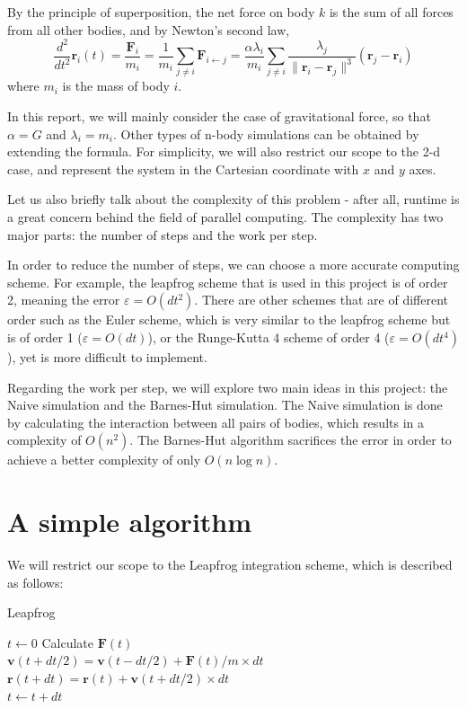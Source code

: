 \documentclass[12pt]{article}
\begin{document}
By the principle of superposition, the net force on body $k$ is the sum of all forces from all other bodies, and by Newton's second law, 
$$\frac{d^2}{dt^2} \boldsymbol{r}_i(t) 
= \frac{\boldsymbol{F}_i}{m_i} 
= \frac{1}{m_i} \sum_{j \neq i} \boldsymbol{F}_{i \gets j}
= \frac{\alpha \lambda_i}{m_i} \sum_{j \neq i} \frac{\lambda_j}{\|\boldsymbol{r}_i - \boldsymbol{r}_j\|^3} (\boldsymbol{r}_j - \boldsymbol{r}_i)$$
where $m_i$ is the mass of body $i$.

In this report, we will mainly consider the case of gravitational force, so that $\alpha = G$ and $\lambda_i = m_i$. Other types of n-body simulations can be obtained by extending the formula. For simplicity, we will also restrict our scope to the 2-d case, and represent the system in the Cartesian coordinate with $x$ and $y$ axes.

Let us also briefly talk about the complexity of this problem - after all, runtime is a great concern behind the field of parallel computing. The complexity has two major parts: the number of steps and the work per step. 

In order to reduce the number of steps, we can choose a more accurate computing scheme. For example, the leapfrog scheme that is used in this project is of order 2, meaning the error $\varepsilon = O(dt^2)$. There are other schemes that are of different order such as the Euler scheme, which is very similar to the leapfrog scheme but is of order 1 ($\varepsilon = O(dt)$), or the Runge-Kutta 4 scheme of order 4 ($\varepsilon = O(dt^4)$), yet is more difficult to implement.

Regarding the work per step, we will explore two main ideas in this project: the Naive simulation and the Barnes-Hut simulation. The Naive simulation is done by calculating the interaction between all pairs of bodies, which results in a complexity of $O(n^2)$. The Barnes-Hut algorithm sacrifices the error in order to achieve a better complexity of only $O(n \log n)$.

\section{A simple algorithm}
We will restrict our scope to the Leapfrog \cite{wiki:Leapfrog_integration} integration scheme, which is described as follows:

\begin{algorithm}
\caption{Leapfrog}

$t\gets 0$\;
 {
    Calculate $\boldsymbol{F}(t)$ \\
    $\boldsymbol{v}(t + dt/2) = \boldsymbol{v}(t-dt/2) + \boldsymbol{F}(t) / m \times dt$\\
    $\boldsymbol{r}(t + dt) = \boldsymbol{r}(t) + \boldsymbol{v}(t+dt/2) \times dt$\\
    $t\gets t + dt$\
}
\end{algorithm}
\end{document}
